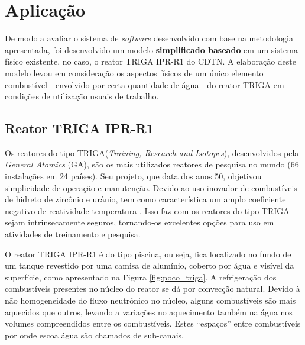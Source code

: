 \chapter{Aplicação}
\label{chap:aplicacao}

De modo a avaliar o sistema de \textit{software} desenvolvido com base na metodologia apresentada, 
foi desenvolvido um modelo \textbf{simplificado baseado} em um sistema físico existente, no caso,
o reator TRIGA IPR-R1 do CDTN. A elaboração deste modelo levou em consideração os aspectos físicos
de um único elemento combustível - envolvido por certa quantidade de água - do reator TRIGA
em condições de utilização usuais de trabalho.

\section{Reator TRIGA IPR-R1}
\label{sec:triga}


Os reatores do tipo TRIGA\textregistered (\textit{Training, Research and Isotopes}),
desenvolvidos pela \textit{General Atomics} (GA), são os mais utilizados
reatores de pesquisa no mundo (66 instalações em 24 países). Seu projeto, que data dos anos 50,
objetivou simplicidade de operação e manutenção. Devido ao uso inovador de combustíveis de hidreto
de zircônio e urânio, tem como característica um amplo coeficiente negativo
de reatividade-temperatura \cite[Capítulo~1]{Veloso2005}. Isso faz com os reatores do tipo TRIGA sejam
intrinsecamente seguros, tornando-os excelentes opções para uso em atividades de treinamento
e pesquisa.


O reator TRIGA IPR-R1 é do tipo piscina, ou seja, fica localizado no fundo de um tanque revestido por uma
camisa de alumínio, coberto por água e visível da superfície, como apresentado na Figura \ref{fig:poco_triga}.
A refrigeração dos combustíveis presentes no núcleo do reator se dá por convecção natural. Devido à não homogeneidade
do fluxo neutrônico no núcleo, alguns combustíveis são mais aquecidos que outros, levando a variações
no aquecimento também na água nos volumes compreendidos entre os combustíveis. Estes ``espaços'' entre
combustíveis por onde escoa água são chamados de sub-canais.

